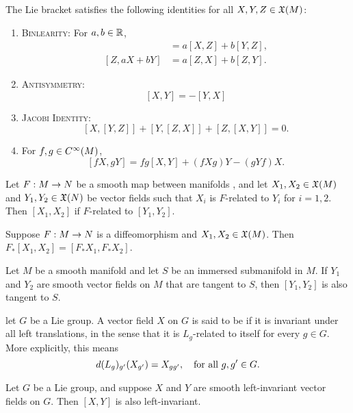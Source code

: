 \setcounter{thm}{27}

\begin{prop}
The Lie bracket satisfies the following identities for all $X,Y,Z\in \mathfrak{X}(M)$:
\begin{enumerate}
    \item {\scshape Binlearity:} For $a,b\in \mathbb{R}$,
    \begin{align*}
        [aX + bY, Z] &= a[X,Z] + b[Y,Z],\\
        [Z, aX + bY] &= a[Z,X] + b[Z,Y].
    \end{align*}
    \item {\scshape Antisymmetry:}
    \[[X,Y] = -[Y,X]\]
    \item {\scshape Jacobi Identity:}
    \[[X,[Y,Z]] + [Y,[Z,X]] + [Z,[X,Y]] = 0.\]
    \item For $f,g\in C^\infty(M)$,
    \[[fX,gY] = fg [X,Y] + (fXg)Y - (gYf)X.\]
\end{enumerate}
\end{prop}

\setcounter{thm}{29}

\begin{prop}
Let $F:M\rightarrow N$ be a smooth map between manifolds \wowob, and let $X_1,X_2\in \mathfrak{X}(M)$ and $Y_1,Y_2\in \mathfrak{X}(N)$ be vector fields such that $X_i$ is $F$-related to $Y_i$ for $i = 1,2$. Then $[X_1,X_2]$ if $F$-related to $[Y_1,Y_2]$.
\end{prop}

\begin{cor}
Suppose $F:M\rightarrow N$ is a diffeomorphism and $X_1,X_2\in \mathfrak{X}(M)$. Then $F_*[X_1,X_2] = [F_*X_1,F_*X_2]$.
\end{cor}

\begin{cor}
Let $M$ be a smooth manifold and let $S$ be an immersed submanifold \wowob in $M$. If $Y_1$ and $Y_2$ are smooth vector fields on $M$ that are tangent to $S$, then $[Y_1,Y_2]$ is also tangent to $S$.
\end{cor}

\dfn let $G$ be a Lie group. A vector field $X$ on $G$ is said to be  if it is invariant under all left translations, in the sense that it is $L_g$-related to itself for every $g\in G$. More explicitly, this means
\[d(L_g)_{g^\prime}(X_{g^\prime}) = X_{gg^\prime},\quad\text{for all }g,g^\prime\in G.\]

\begin{prop}
Let $G$ be a Lie group, and suppose $X$ and $Y$ are smooth left-invariant vector fields on $G$. Then $[X,Y]$ is also left-invariant.
\end{prop}

